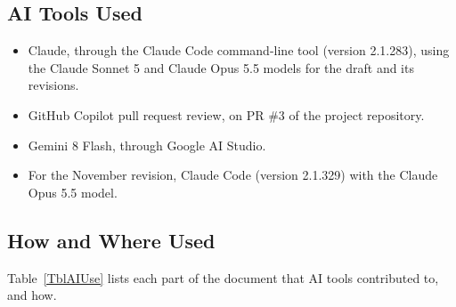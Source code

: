 \documentclass{article}
\begin{document}
\subsection{AI Tools Used}

\begin{itemize}
  \item Claude, through the Claude Code command-line tool (version
  2.1.283), using the Claude Sonnet 5 and Claude Opus 5.5 models for the
  draft and its revisions.
  \item GitHub Copilot pull request review, on PR \#3 of the project
  repository.
  \item Gemini 8 Flash, through Google AI Studio.
  \item For the November revision, Claude Code (version 2.1.329) with the
  Claude Opus 5.5 model.
\end{itemize}

\subsection{How and Where Used}

Table~\ref{TblAIUse} lists each part of the document that AI tools
contributed to, and how.
\end{document}
